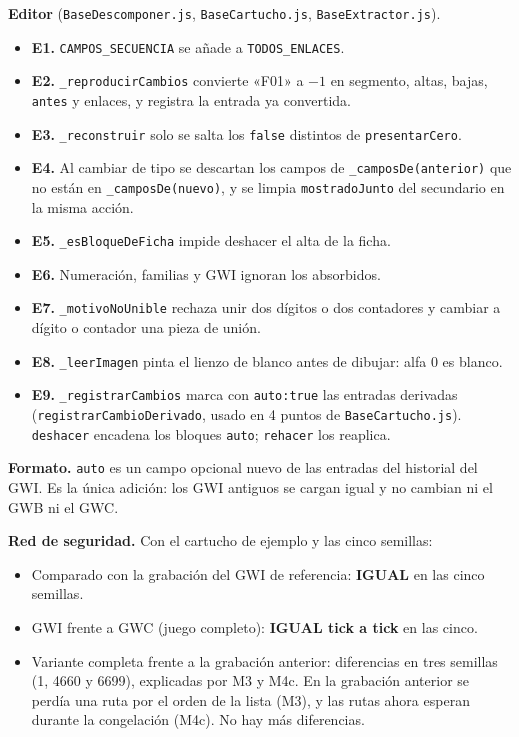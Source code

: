 \textbf{Editor} (\texttt{BaseDescomponer.js}, \texttt{BaseCartucho.js}, \texttt{BaseExtractor.js}).
\begin{itemize}
	\item \textbf{E1.} \texttt{CAMPOS\_SECUENCIA} se añade a \texttt{TODOS\_ENLACES}.
	\item \textbf{E2.} \texttt{\_reproducirCambios} convierte «F01» a $-1$ en segmento, altas, bajas, \texttt{antes} y enlaces, y registra la entrada ya convertida.
	\item \textbf{E3.} \texttt{\_reconstruir} solo se salta los \texttt{false} distintos de \texttt{presentarCero}.
	\item \textbf{E4.} Al cambiar de tipo se descartan los campos de \texttt{\_camposDe(anterior)} que no están en \texttt{\_camposDe(nuevo)}, y se limpia \texttt{mostradoJunto} del secundario en la misma acción.
	\item \textbf{E5.} \texttt{\_esBloqueDeFicha} impide deshacer el alta de la ficha.
	\item \textbf{E6.} Numeración, familias y GWI ignoran los absorbidos.
	\item \textbf{E7.} \texttt{\_motivoNoUnible} rechaza unir dos dígitos o dos contadores y cambiar a dígito o contador una pieza de unión.
	\item \textbf{E8.} \texttt{\_leerImagen} pinta el lienzo de blanco antes de dibujar: alfa 0 es blanco.
	\item \textbf{E9.} \texttt{\_registrarCambios} marca con \texttt{auto:true} las entradas derivadas (\texttt{registrarCambioDerivado}, usado en 4 puntos de \texttt{BaseCartucho.js}). \texttt{deshacer} encadena los bloques \texttt{auto}; \texttt{rehacer} los reaplica.
\end{itemize}

\textbf{Formato.} \texttt{auto} es un campo opcional nuevo de las entradas del historial del GWI. Es la única adición: los GWI antiguos se cargan igual y no cambian ni el GWB ni el GWC.

\textbf{Red de seguridad.} Con el cartucho de ejemplo y las cinco semillas:
\begin{itemize}
	\item Comparado con la grabación del GWI de referencia: \textbf{IGUAL} en las cinco semillas.
	\item GWI frente a GWC (juego completo): \textbf{IGUAL tick a tick} en las cinco.
	\item Variante completa frente a la grabación anterior: diferencias en tres semillas (1, 4660 y 6699), explicadas por M3 y M4c. En la grabación anterior se perdía una ruta por el orden de la lista (M3), y las rutas ahora esperan durante la congelación (M4c). No hay más diferencias.
\end{itemize}

